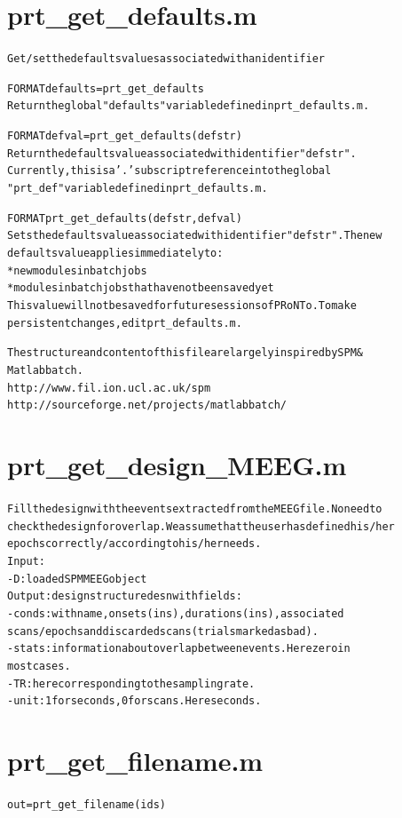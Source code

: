 \section{prt\_get\_defaults.m}
\begin{alltt}

 Get/set the defaults values associated with an identifier
 
 FORMAT defaults = prt\_get\_defaults
 Return the global "defaults" variable defined in prt\_defaults.m.
 
 FORMAT defval = prt\_get\_defaults(defstr)
 Return the defaults value associated with identifier "defstr". 
 Currently, this is a '.' subscript reference into the global  
 "prt\_def" variable defined in prt\_defaults.m.
 
 FORMAT prt\_get\_defaults(defstr, defval)
 Sets the defaults value associated with identifier "defstr". The new
 defaults value applies immediately to:
 * new modules in batch jobs
 * modules in batch jobs that have not been saved yet
 This value will not be saved for future sessions of PRoNTo. To make
 persistent changes, edit prt\_defaults.m.
 
 The structure and content of this file are largely inspired by SPM \&
 Matlabbatch.
 http://www.fil.ion.ucl.ac.uk/spm
 http://sourceforge.net/projects/matlabbatch/
\end{alltt}


\section{prt\_get\_design\_MEEG.m}
\begin{alltt}

 Fill the design with the events extracted from the MEEG file. No need to
 check the design for overlap. We assume that the user has defined his/her
 epochs correctly/according to his/her needs.
 Input: 
           - D:   loaded SPM MEEG object
 Output: design structure desn with fields:
           - conds: with name, onsets (in s), durations (in s), associated
           scans/epochs and discarded scans (trials marked as bad).
           - stats: information about overlap between events. Here zero in
           most cases.
           - TR: here corresponding to the sampling rate.
           - unit: 1 for seconds, 0 for scans. Here seconds.
\end{alltt}


\section{prt\_get\_filename.m}
\begin{alltt}

 out = prt\_get\_filename(ids)
 
\end{alltt}


